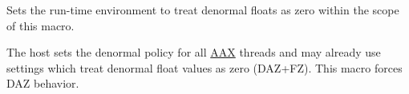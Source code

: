 Sets the run-\/time environment to treat denormal floats as zero within the scope of this macro. 

The host sets the denormal policy for all \hyperlink{a00288}{A\+A\+X} threads and may already use settings which treat denormal float values as zero (D\+A\+Z+\+F\+Z). This macro forces D\+A\+Z behavior. 